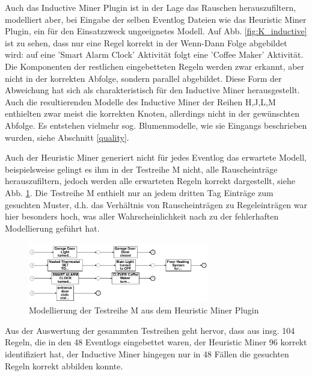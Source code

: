 Auch das Inductive Miner Plugin ist in der Lage das Rauschen herauszufiltern, modelliert aber, bei Eingabe der selben Eventlog Dateien wie das Heuristic Miner Plugin, ein für den Einsatzzweck ungeeignetes Modell. 
Auf Abb. \ref{fig:K_inductive} ist zu sehen, dass nur eine Regel korrekt in der Wenn-Dann Folge abgebildet wird: auf eine 'Smart Alarm Clock' Aktivität folgt eine 'Coffee Maker' Aktivität. Die Komponenten der restlichen eingebetteten Regeln werden zwar erkannt, aber nicht in der korrekten Abfolge, sondern parallel abgebildet. Diese Form der Abweichung hat sich als charakteristisch für den Inductive Miner herausgestellt. Auch die resultierenden Modelle des Inductive Miner der Reihen H,J,L,M enthielten zwar meist die korrekten Knoten, allerdings nicht in der gewünschten Abfolge. Es entstehen vielmehr sog. Blumenmodelle, wie sie Eingangs beschrieben wurden, siehe Abschnitt \ref{quality}.

Auch der Heuristic Miner generiert nicht für jedes Eventlog das erwartete Modell, beispielsweise gelingt es ihm in der Testreihe M nicht, alle Rauscheinträge herauszufiltern, jedoch werden alle erwarteten Regeln korrekt dargestellt, siehe Abb. \ref{fig:M_heuristic}. 
Die Testreihe M enthielt nur an jedem dritten Tag Einträge zum gesuchten Muster, d.h. das Verhältnis von Rauscheinträgen zu Regeleinträgen war hier besonders hoch, was aller Wahrscheinlichkeit nach zu der fehlerhaften Modellierung geführt hat.
\begin{figure}[!ht]
    \centering
    \includegraphics[width=0.7\textwidth,]{figures/Appbildungen/M_Heuristic.PNG}
    \caption{Modellierung der Testreihe M aus dem Heuristic Miner Plugin}
    \label{fig:M_heuristic}
\end{figure}
Aus der Auswertung der gesammten Testreihen geht hervor, dass aus insg. 104 Regeln, die in den 48 Eventlogs eingebettet waren, der Heuristic Miner 96 korrekt identifiziert hat, der Inductive Miner hingegen nur in 48 Fällen die gesuchten Regeln korrekt abbilden konnte.

